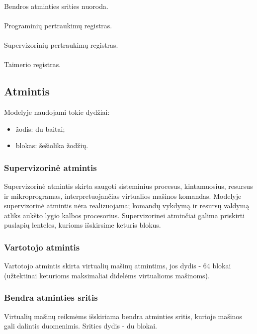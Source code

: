 \documentclass{scrartcl}
\begin{document}
                \paragraph{} Bendros atminties srities nuoroda.
                \paragraph{} Programinių pertraukimų registras.
                \paragraph{} Supervizorinių pertraukimų registras.
                \paragraph{} Taimerio registras.
        \subsection{Atmintis}
            Modelyje naudojami tokie dydžiai:
            \begin{itemize}
                \item žodis: du baitai;
                \item blokas: šešiolika žodžių.
            \end{itemize}
            \subsubsection{Supervizorinė atmintis}
                Supervizorinė atmintis skirta saugoti sisteminius procesus, kintamuosius, resursus ir mikroprogramas, interpretuojančias virtualios mašinos komandas. Modelyje supervizorinė atmintis nėra realizuojama; komandų vykdymą ir resursų valdymą atliks aukšto lygio kalbos procesorius. Supervizorinei atminčiai galima priskirti puslapių lenteles, kurioms išskirsime keturis blokus.
            \subsubsection{Vartotojo atmintis}
                Vartotojo atmintis skirta virtualių mašinų atmintims, jos dydis - 64 blokai (užtektinai keturioms maksimaliai didelėms virtualioms mašinoms).
            \subsubsection{Bendra atminties sritis}
                Virtualių mašinų reikmėms išskiriama bendra atminties sritis, kurioje mašinos gali dalintis duomenimis. Srities dydis - du blokai.
\end{document}
